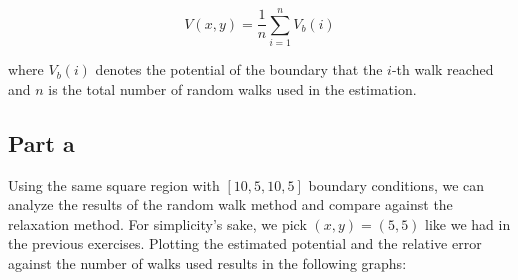 \documentclass[a4paper,12pt]{article}
\begin{document}
\begin{equation*}
  V(x, y) = \frac{1}{n}\sum_{i = 1}^{n} V_b(i)
\end{equation*}

where $V_b(i)$ denotes the potential of the boundary that the $i$-th walk reached and $n$ is the total number of
random walks used in the estimation.

\subsection*{Part a}

Using the same square region with $[10, 5, 10, 5]$ boundary conditions, we can analyze the results of the random walk
method and compare against the relaxation method. For simplicity's sake, we pick $(x, y) = (5, 5)$ like we had in
the previous exercises. Plotting the estimated potential and the relative error against the number of walks used
results in the following graphs:
\end{document}
